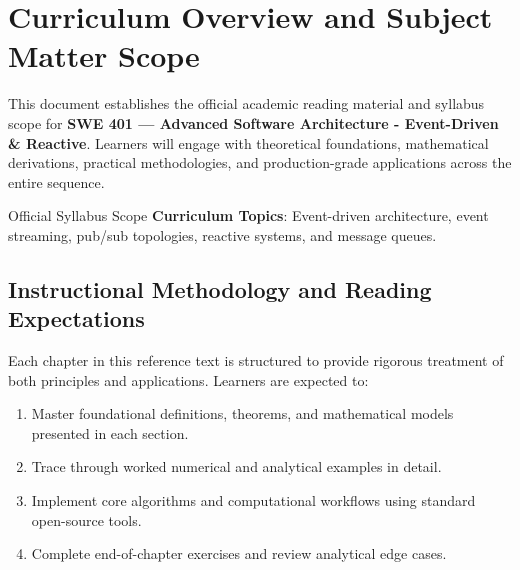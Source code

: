 \section{Curriculum Overview and Subject Matter Scope}

This document establishes the official academic reading material and syllabus scope for \textbf{SWE 401 --- Advanced Software Architecture - Event-Driven \& Reactive}. Learners will engage with theoretical foundations, mathematical derivations, practical methodologies, and production-grade applications across the entire sequence.

\begin{InsightBox}{Official Syllabus Scope}
  \textbf{Curriculum Topics}: Event-driven architecture, event streaming, pub/sub topologies, reactive systems, and message queues.
\end{InsightBox}

\subsection{Instructional Methodology and Reading Expectations}

Each chapter in this reference text is structured to provide rigorous treatment of both principles and applications. Learners are expected to:
\begin{enumerate}
  \item Master foundational definitions, theorems, and mathematical models presented in each section.
  \item Trace through worked numerical and analytical examples in detail.
  \item Implement core algorithms and computational workflows using standard open-source tools.
  \item Complete end-of-chapter exercises and review analytical edge cases.
\end{enumerate}

